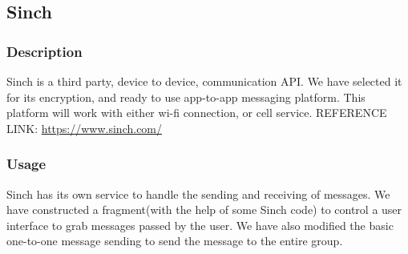 \subsection{Sinch}
	\subsubsection{Description}
	Sinch is a third party, device to device, communication API. We have selected it for its encryption, and ready to use app-to-app messaging platform. This platform will work with either wi-fi connection, or cell service. 
\newline
REFERENCE LINK: \url{https://www.sinch.com/}
	
	\subsubsection{Usage}
	Sinch has its own service to handle the sending and receiving of messages. We have constructed a fragment(with the help of some Sinch code) to control a user interface to grab messages passed by the user. We have also modified the basic one-to-one message sending to send the message to the entire group.



